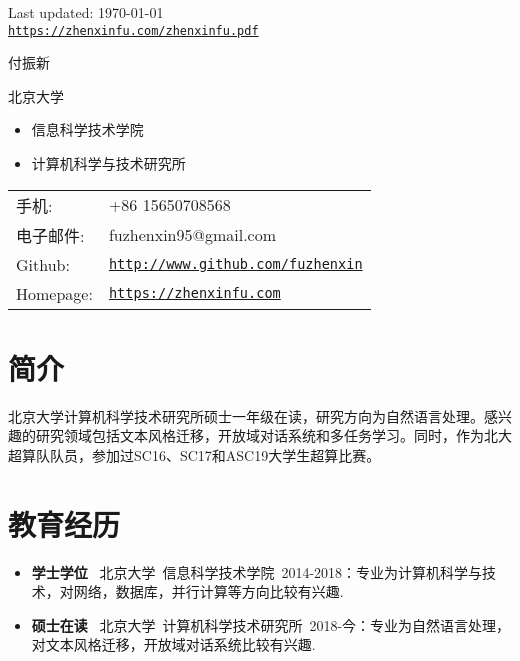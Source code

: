 \documentclass[letterpaper]{article}
\def\footerlink{https://zhenxinfu.com/zhenxinfu.pdf}
\begin{document}
\bigskip


\begin{center}
  \begin{footnotesize}
    Last updated: \today \\
    \href{\footerlink}{\texttt{\footerlink}}
  \end{footnotesize}
\end{center}

\clearpage


{\huge 付振新}


\vspace{0.25in}

\begin{minipage}{0.45\linewidth}
  \begin{large}北京大学\end{large}
  \begin{itemize}
    \itemsep=-0.02in
      \item 信息科学技术学院
      \item 计算机科学与技术研究所
  \end{itemize}
  
\end{minipage}
\begin{minipage}{0.45\linewidth}
  \begin{tabular}{ll}
    手机: & +86 15650708568 \\
    电子邮件: & fuzhenxin95@gmail.com \\
    Github: & \href{https://www.github.com/fuzhenxin}{\tt http://www.github.com/fuzhenxin} \\
    Homepage: & \href{http://zhenxinfu.com}{\tt https://zhenxinfu.com} \\
  \end{tabular}
\end{minipage}


\section*{简介}
北京大学计算机科学技术研究所硕士一年级在读，研究方向为自然语言处理。感兴趣的研究领域包括文本风格迁移，开放域对话系统和多任务学习。同时，作为北大超算队队员，参加过SC16、SC17和ASC19大学生超算比赛。


\section*{教育经历}
\begin{itemize}
  \item \textbf{学士学位} ~北京大学~信息科学技术学院~2014-2018：专业为计算机科学与技术，对网络，数据库，并行计算等方向比较有兴趣.
  \item \textbf{硕士在读} ~北京大学~计算机科学技术研究所~2018-今：专业为自然语言处理，对文本风格迁移，开放域对话系统比较有兴趣.
\end{itemize}
\end{document}

